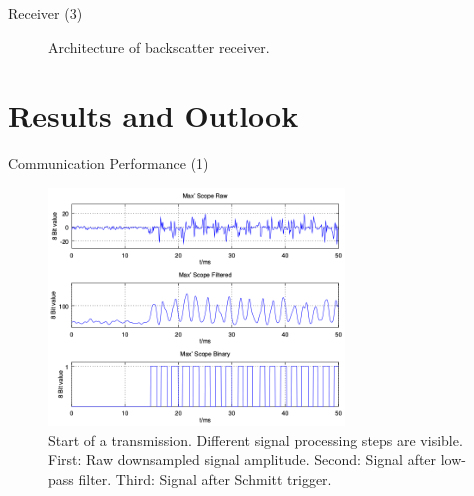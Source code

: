 \documentclass[apectratio=169]{beamer}
\begin{document}
\begin{frame}{Receiver (3)}
	\begin{figure}[H]	
		\centering
		\caption{Architecture of backscatter receiver.}
	\end{figure}
\end{frame}

\section{Results and Outlook}

\begin{frame}{Communication Performance (1)}
	\begin{figure}[h]
	\centering
	\includegraphics[width=0.7\textwidth]{./fig/transmission}
	\caption{Start of a transmission. Different signal processing steps are visible. First: Raw downsampled signal amplitude. Second: Signal after low-pass filter. Third: Signal after Schmitt trigger.}
	\label{fig:transmission}	
\end{figure}
\end{frame}
\end{document}
